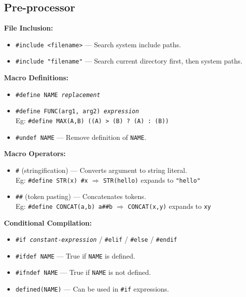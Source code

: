 \subsection{Pre-processor}

\begin{minipage}{\linewidth}

\textbf{File Inclusion:}
\begin{itemize}
    \setlength{\itemsep}{-0.5em}
    \item \texttt{\#include <filename>} --- Search system include paths.
    \item \texttt{\#include "filename"} --- Search current directory first, then system paths.
\end{itemize}

\textbf{Macro Definitions:}
\begin{itemize}
    \setlength{\itemsep}{-0.5em}
    \item \texttt{\#define NAME \textit{replacement}}
    \item \texttt{\#define FUNC(arg1, arg2) \textit{expression}}\\
            Eg: \texttt{\#define MAX(A,B) ((A) > (B) ? (A) : (B))}
    \item \texttt{\#undef NAME} --- Remove definition of \texttt{NAME}.
\end{itemize}

\textbf{Macro Operators:}
\begin{itemize}
    \setlength{\itemsep}{-0.5em}
    \item \texttt{\#} (stringification) --- Converts argument to string literal. \\
    Eg: \texttt{\#define STR(x) \#x} $\Rightarrow$ \texttt{STR(hello)} expands to \texttt{"hello"}

    \item \texttt{\#\#} (token pasting) --- Concatenates tokens. \\
    Eg: \texttt{\#define CONCAT(a,b) a\#\#b} $\Rightarrow$ \texttt{CONCAT(x,y)} expands to \texttt{xy}
\end{itemize}

\textbf{Conditional Compilation:}
\begin{itemize}
    \setlength{\itemsep}{-0.5em}
    \item \texttt{\#if \textit{constant-expression}} / \texttt{\#elif} / \texttt{\#else} / \texttt{\#endif}
    \item \texttt{\#ifdef NAME} --- True if \texttt{NAME} is defined.
    \item \texttt{\#ifndef NAME} --- True if \texttt{NAME} is not defined.
    \item \texttt{defined(NAME)} --- Can be used in \texttt{\#if} expressions.


\end{itemize}
\end{minipage}
